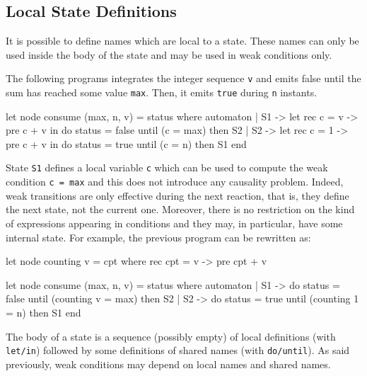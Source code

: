 \documentclass[11pt,titlepage,twoside]{report}
\begin{document}
\subsection{Local State Definitions\label{statelocaldefs}} %

It is possible to define names which are local to a state. These names
can only be used inside the body of the state and may be used in weak
conditions only.

The following programs integrates the integer sequence \verb-v- and
emits false until the sum has reached some value \verb-max-. Then, it
emits \verb-true- during \verb-n- instants.
\begin{chklisting}
let node consume (max, n, v) = status where
  automaton
  | S1 ->
      let rec c = v -> pre c + v in
      do status = false
      until (c = max) then S2
  | S2 ->
      let rec c = 1 -> pre c + v in
      do status = true
      until (c = n) then S1
  end
\end{chklisting}

State \verb-S1- defines a local variable \verb-c- which can be used to
compute the weak condition \verb-c = max- and this does not introduce
any causality problem. Indeed, weak transitions are only effective
during the next reaction, that is, they define the next state, not the
current one. Moreover, there is no restriction on the kind of
expressions appearing in conditions and they may, in particular, have
some internal state. For example, the previous program can be
rewritten as:
\begin{chklisting}
let node counting v = cpt where
  rec cpt = v -> pre cpt + v

let node consume (max, n, v) = status where
  automaton
  | S1 ->
       do status = false
       until (counting v = max) then S2
  | S2 ->
       do status = true
       until (counting 1 = n) then S1
  end
\end{chklisting}
The body of a state is a sequence (possibly empty) of local
definitions (with \verb-let/in-) followed by some definitions of
shared names (with \verb-do/until-). As said previously, weak
conditions may depend on local names and shared names.
\end{document}
